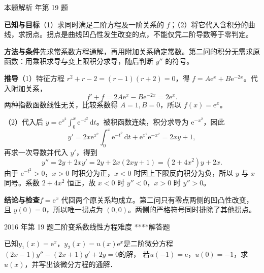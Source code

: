 \documentclass[UTF8,zihao=-4,fontset=fandol]{ctexart}
\newcounter{BankQuestion}
\newcommand{\QuestionPage}[7]{%
  \stepcounter{BankQuestion}%
  \par\noindent\begin{minipage}{\linewidth}
  \raggedright
  {\small\textcolor{black!60}{#3\quad #5\quad 难度 #7}\hfill\textcolor{accent}{#2}}\par\smallskip}
\newcommand{\QuestionEnd}{\end{minipage}\par\medskip}
\newcommand{\QuestionPage}[7]{%
  \clearpage
  \stepcounter{BankQuestion}%
  {\small\textcolor{accent}{#1\hfill #2}}\par\medskip
  {\small\textcolor{black!60}{#3\quad #5\quad 难度 #7\hfill \arabic{BankQuestion} / 234}}\par\vspace{9bp}}
\newcommand{\QuestionEnd}{}
\newenvironment{QuestionSolution}[1]{%
  \clearpage
  {\small\textcolor{black!60}{本题解析\quad #1}}\par\medskip
}{\par\clearpage}
\begin{document}
\begin{QuestionSolution}{2012 年第 19 题}
\textbf{已知与目标}\quad （1）求同时满足二阶方程及一阶关系的 \(f\)；（2）将它代入含积分的曲线，求拐点。拐点是曲线凹凸性发生改变的点，不能仅凭二阶导数等于零判定。

\textbf{方法与条件}\quad 先求常系数方程通解，再用附加关系确定常数。第二问的积分无需求原函数：用乘积求导与变上限积分求导，随后判断 \(y''\) 的符号。

\textbf{推导}\quad （1）特征方程 \(r^2+r-2=(r-1)(r+2)=0\)，得 \(f=A\mathrm{e}^x+B\mathrm{e}^{-2x}\)。代入附加关系，
\[
f'+f=2A\mathrm{e}^x-B\mathrm{e}^{-2x}=2\mathrm{e}^x.
\]
两种指数函数线性无关，比较系数得 \(A=1,B=0\)，所以 \(\boxed{f(x)=\mathrm{e}^x}\)。

（2）代入后 \(y=\mathrm{e}^{x^2}\int_0^x\mathrm{e}^{-t^2}\,\mathrm{d}t\)。被积函数连续，积分求导为 \(\mathrm{e}^{-x^2}\)，因此
\[
y'=2x\mathrm{e}^{x^2}\int_0^x\mathrm{e}^{-t^2}\,\mathrm{d}t
+\mathrm{e}^{x^2}\mathrm{e}^{-x^2}=2xy+1,
\]
再求一次导数并代入 \(y'\)，得到
\[
y''=2y+2xy'=2y+2x(2xy+1)=(2+4x^2)y+2x.
\]
由于 \(\mathrm{e}^{-t^2}>0\)，\(x>0\) 时积分为正，\(x<0\) 时因上下限反向积分为负，所以 \(y\) 与 \(x\) 同号。系数 \(2+4x^2\) 恒正，故 \(x<0\) 时 \(y''<0\)，\(x>0\) 时 \(y''>0\)。

\textbf{结论与检查}\quad \(f=\mathrm{e}^x\) 代回两个原关系均成立。第二问只有零点两侧的凹凸性改变，且 \(y(0)=0\)，所以唯一拐点为 \(\boxed{(0,0)}\)。两侧的严格符号同时排除了其他拐点。
\end{QuestionSolution}

\QuestionPage{4.2 高阶线性微分方程}{解答题}{2016 年第 19 题}{3}{二阶变系数线性方程}{233 / 234}{****}
已知$y_1(x) = \mathrm{e}^x$，$y_2(x) = u(x) \mathrm{e}^x$是二阶微分方程$(2x - 1)y'' - (2x + 1)y' + 2y = 0$的解，
若$u(- 1) = \mathrm{e}$，$u(0) = - 1$，求$u(x)$，并写出该微分方程的通解．
\QuestionEnd
\end{document}

